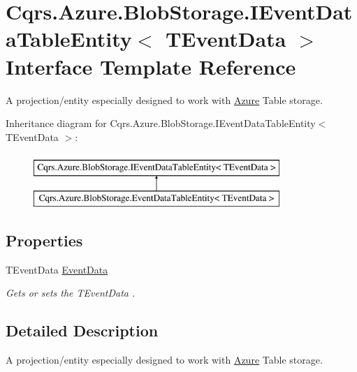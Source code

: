 \hypertarget{interfaceCqrs_1_1Azure_1_1BlobStorage_1_1IEventDataTableEntity}{}\section{Cqrs.\+Azure.\+Blob\+Storage.\+I\+Event\+Data\+Table\+Entity$<$ T\+Event\+Data $>$ Interface Template Reference}
\label{interfaceCqrs_1_1Azure_1_1BlobStorage_1_1IEventDataTableEntity}


A projection/entity especially designed to work with \hyperlink{namespaceCqrs_1_1Azure}{Azure} Table storage.  


Inheritance diagram for Cqrs.\+Azure.\+Blob\+Storage.\+I\+Event\+Data\+Table\+Entity$<$ T\+Event\+Data $>$\+:\begin{figure}[H]
\begin{center}
\leavevmode
\includegraphics[height=2.000000cm]{interfaceCqrs_1_1Azure_1_1BlobStorage_1_1IEventDataTableEntity}
\end{center}
\end{figure}
\subsection*{Properties}
\begin{DoxyCompactItemize}
\item 
T\+Event\+Data \hyperlink{interfaceCqrs_1_1Azure_1_1BlobStorage_1_1IEventDataTableEntity_aa7b1f06172ce68c2cb2248be422edfe5_aa7b1f06172ce68c2cb2248be422edfe5}{Event\+Data}
\begin{DoxyCompactList}\small\item\em Gets or sets the {\itshape T\+Event\+Data} . \end{DoxyCompactList}\end{DoxyCompactItemize}


\subsection{Detailed Description}
A projection/entity especially designed to work with \hyperlink{namespaceCqrs_1_1Azure}{Azure} Table storage. 



